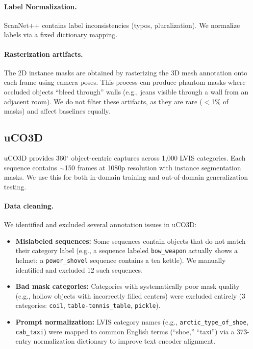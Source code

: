 \paragraph{Label Normalization.}
ScanNet++ contains label inconsistencies (typos, pluralization). We normalize labels via a fixed dictionary mapping.

\paragraph{Rasterization artifacts.}
The 2D instance masks are obtained by rasterizing the 3D mesh annotation onto each frame using camera poses. This process can produce phantom masks where occluded objects ``bleed through'' walls (e.g., jeans visible through a wall from an adjacent room). We do not filter these artifacts, as they are rare ($<$1\% of masks) and affect baselines equally.

\subsection{uCO3D}

uCO3D provides 360$^\circ$ object-centric captures across 1,000 LVIS categories. Each sequence contains $\sim$150 frames at 1080p resolution with instance segmentation masks. We use this for both in-domain training and out-of-domain generalization testing.

\paragraph{Data cleaning.} We identified and excluded several annotation issues in uCO3D:
\begin{itemize}[nosep,leftmargin=*]
    \item \textbf{Mislabeled sequences:} Some sequences contain objects that do not match their category label (e.g., a sequence labeled \texttt{bow\_weapon} actually shows a helmet; a \texttt{power\_shovel} sequence contains a tea kettle). We manually identified and excluded 12 such sequences.
    \item \textbf{Bad mask categories:} Categories with systematically poor mask quality (e.g., hollow objects with incorrectly filled centers) were excluded entirely (3 categories: \texttt{coil}, \texttt{table-tennis\_table}, \texttt{pickle}).
    \item \textbf{Prompt normalization:} LVIS category names (e.g., \texttt{arctic\_type\_of\_shoe}, \texttt{cab\_taxi}) were mapped to common English terms (``shoe,'' ``taxi'') via a 373-entry normalization dictionary to improve text encoder alignment.
\end{itemize}

